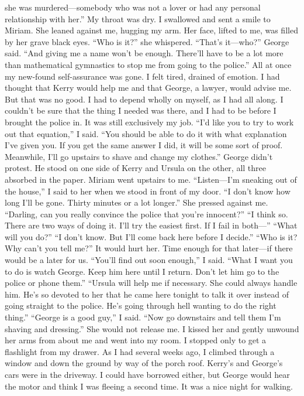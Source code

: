 \documentclass{novel}
\begin{document}
she was murdered—somebody who was not a lover or had any personal relationship with her.” My throat was dry. I swallowed and sent a smile to Miriam. She leaned against me, hugging my arm. Her face, lifted to me, was filled by her grave black eyes. “Who is it?” she whispered. “That’s it—who?” George said. “And giving me a name won’t be enough. There’ll have to be a lot more than mathematical gymnastics to stop me from going to the police.” All at once my new-found self-assurance was gone. I felt tired, drained of emotion. I had thought that Kerry would help me and that George, a lawyer, would advise me. But that was no good. I had to depend wholly on myself, as I had all along. I couldn’t be sure that the thing I needed was there, and I had to be before I brought the police in. It was still exclusively my job. “I’d like you to try to work out that equation,” I said. “You should be able to do it with what explanation I’ve given you. If you get the same answer I did, it will be some sort of proof. Meanwhile, I’ll go upstairs to shave and change my clothes.” George didn’t protest. He stood on one side of Kerry and Ursula on the other, all three absorbed in the paper. Miriam went upstairs to me. “Listen—I’m sneaking out of the house,” I said to her when we stood in front of my door. “I don’t know how long I’ll be gone. Thirty minutes or a lot longer.” She pressed against me. “Darling, can you really convince the police that you’re innocent?” “I think so. There are two ways of doing it. I’ll try the easiest first. If I fail in both—” “What will you do?” “I don’t know. But I’ll come back here before I decide.” “Who is it? Why can’t you tell me?” It would hurt her. Time enough for that later—if there would be a later for us. “You’ll find out soon enough,” I said. “What I want you to do is watch George. Keep him here until I return. Don’t let him go to the police or phone them.” “Ursula will help me if necessary. She could always handle him. He’s so devoted to her that he came here tonight to talk it over instead of going straight to the police. He’s going through hell wanting to do the right thing.” “George is a good guy,” I said. “Now go downstairs and tell them I’m shaving and dressing.” She would not release me. I kissed her and gently unwound her arms from about me and went into my room. I stopped only to get a flashlight from my drawer. As I had several weeks ago, I climbed through a window and down the ground by way of the porch roof. Kerry’s and George’s cars were in the driveway. I could have borrowed either, but George would hear the motor and think I was fleeing a second time. It was a nice night for walking.
\end{document}
